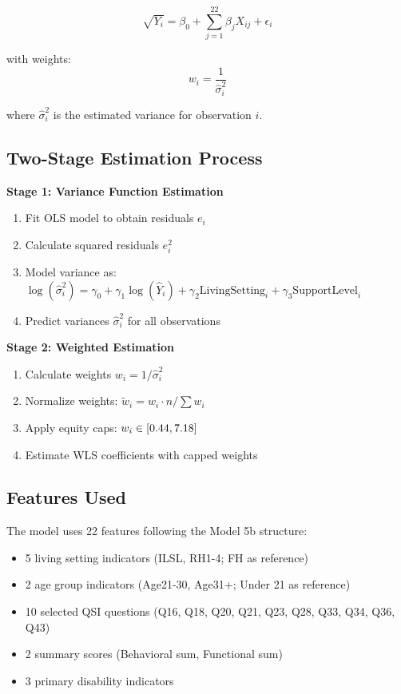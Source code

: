 \begin{equation}
\sqrt{Y_i} = \beta_0 + \sum_{j=1}^{22} \beta_j X_{ij} + \epsilon_i
\end{equation}

with weights:
\begin{equation}
w_i = \frac{1}{\hat{\sigma}_i^2}
\end{equation}

where $\hat{\sigma}_i^2$ is the estimated variance for observation $i$.

\subsection{Two-Stage Estimation Process}

\textbf{Stage 1: Variance Function Estimation}
\begin{enumerate}
    \item Fit OLS model to obtain residuals $e_i$
    \item Calculate squared residuals $e_i^2$
    \item Model variance as: $\log(\hat{\sigma}_i^2) = \gamma_0 + \gamma_1 \log(\hat{Y}_i) + \gamma_2 \text{LivingSetting}_i + \gamma_3 \text{SupportLevel}_i$
    \item Predict variances $\hat{\sigma}_i^2$ for all observations
\end{enumerate}

\textbf{Stage 2: Weighted Estimation}
\begin{enumerate}
    \item Calculate weights $w_i = 1/\hat{\sigma}_i^2$
    \item Normalize weights: $\tilde{w}_i = w_i \cdot n / \sum w_i$
    \item Apply equity caps: $w_i \in [0.44{}, 7.18{}]$
    \item Estimate WLS coefficients with capped weights
\end{enumerate}

\subsection{Features Used}

The model uses 22 features following the Model 5b structure:
\begin{itemize}
    \item 5 living setting indicators (ILSL, RH1-4; FH as reference)
    \item 2 age group indicators (Age21-30, Age31+; Under 21 as reference)
    \item 10 selected QSI questions (Q16, Q18, Q20, Q21, Q23, Q28, Q33, Q34, Q36, Q43)
    \item 2 summary scores (Behavioral sum, Functional sum)
    \item 3 primary disability indicators
\end{itemize}

